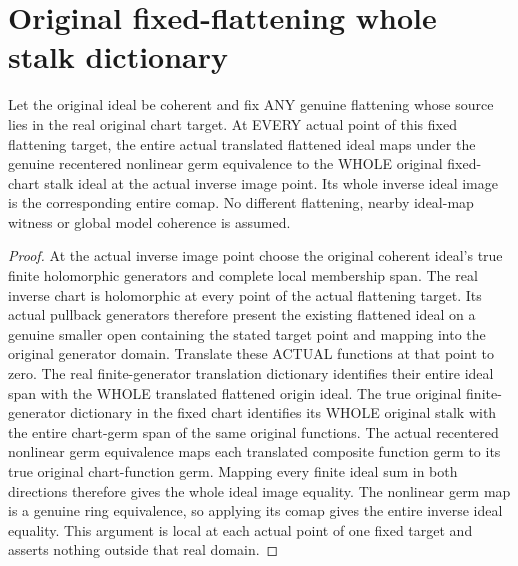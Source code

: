 \section{Original fixed-flattening whole stalk dictionary}

\begin{lemma}
\label{hir:real-domain-fixed-flattening-all-original-whole-stalks}
\leanok
Let the original ideal be coherent and fix ANY genuine flattening whose
source lies in the real original chart target. At EVERY actual point of
this fixed flattening target, the entire actual translated flattened ideal
maps under the genuine recentered nonlinear germ equivalence to the WHOLE
original fixed-chart stalk ideal at the actual inverse image point. Its
whole inverse ideal image is the corresponding entire comap. No different
flattening, nearby ideal-map witness or global model coherence is assumed.
\end{lemma}
\begin{proof}
At the actual inverse image point choose the original coherent ideal's true
finite holomorphic generators and complete local membership span. The real
inverse chart is holomorphic at every point of the actual flattening target.
Its actual pullback generators therefore present the existing flattened
ideal on a genuine smaller open containing the stated target point and
mapping into the original generator domain. Translate these ACTUAL functions
at that point to zero. The real finite-generator translation dictionary
identifies their entire ideal span with the WHOLE translated flattened
origin ideal. The true original finite-generator dictionary in the fixed
chart identifies its WHOLE original stalk with the entire chart-germ span
of the same original functions. The actual recentered nonlinear germ
equivalence maps each translated composite function germ to its true
original chart-function germ. Mapping every finite ideal sum in both
directions therefore gives the whole ideal image equality. The nonlinear
germ map is a genuine ring equivalence, so applying its comap gives the
entire inverse ideal equality. This argument is local at each actual point
of one fixed target and asserts nothing outside that real domain.
\end{proof}

